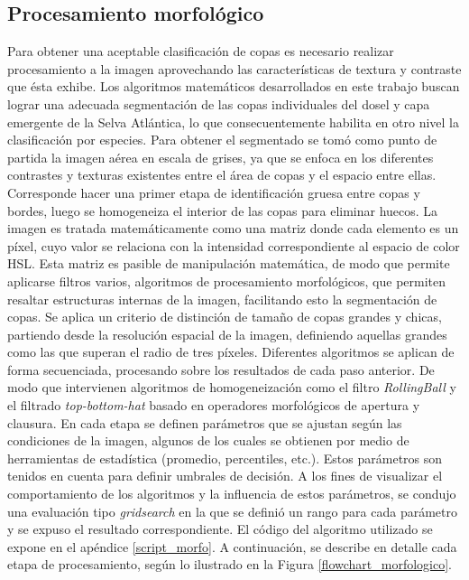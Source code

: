 \subsection{Procesamiento morfológico} %

Para obtener una aceptable clasificación de copas es necesario realizar procesamiento a la imagen aprovechando las características de textura y contraste que ésta exhibe. Los algoritmos matemáticos desarrollados en este trabajo buscan lograr una adecuada segmentación de las copas individuales del dosel y capa emergente de la Selva Atlántica, lo que consecuentemente habilita en otro nivel la clasificación por especies. 
Para obtener el segmentado se tomó como punto de partida la imagen aérea en escala de grises, ya que se enfoca en los diferentes contrastes y texturas existentes entre el área de copas y el espacio entre ellas. Corresponde hacer una primer etapa de identificación gruesa entre copas y bordes, luego se homogeneiza el interior de las copas para eliminar huecos. La imagen es tratada matemáticamente como una matriz donde cada elemento es un píxel, cuyo valor se relaciona con la intensidad correspondiente al espacio de color HSL. Esta matriz es pasible de manipulación matemática, de modo que permite aplicarse filtros varios, algoritmos de procesamiento morfológicos, que permiten resaltar estructuras internas de la imagen, facilitando esto la segmentación de copas. Se aplica un criterio de distinción de tamaño de copas grandes y chicas, partiendo desde la resolución espacial de la imagen, definiendo aquellas grandes como las que superan el radio de tres píxeles. Diferentes algoritmos se aplican de forma secuenciada, procesando sobre los resultados de cada paso anterior. De modo que intervienen algoritmos de homogeneización como el filtro \textit{RollingBall} y el filtrado \textit{top-bottom-hat} basado en operadores morfológicos de apertura y clausura. En cada etapa se definen parámetros que se ajustan según las condiciones
de la imagen, algunos de los cuales se obtienen por medio de herramientas de estadística (promedio, percentiles, etc.). Estos parámetros son tenidos en cuenta para definir umbrales de decisión. A los fines de visualizar el comportamiento de los algoritmos y la influencia de estos parámetros, se condujo una evaluación tipo \textit{gridsearch} en la que se definió un rango para cada parámetro y se expuso el resultado correspondiente. El código del algoritmo utilizado se expone en el apéndice \ref{script_morfo}. A continuación, se describe en detalle cada etapa de procesamiento, según lo ilustrado en la Figura \ref{flowchart_morfologico}. 

